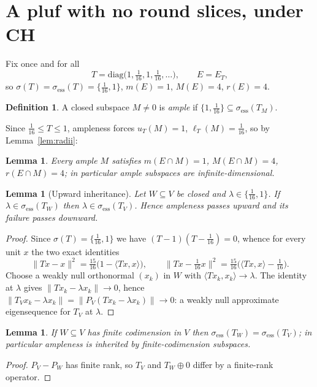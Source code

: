 \documentclass[11pt,reqno]{amsart}
\newtheorem{lemma}[theorem]{Lemma}
\theoremstyle{definition}
\newtheorem{definition}[theorem]{Definition}
\newcommand{\spec}{\sigma}
\newcommand{\sess}{\sigma_{\mathrm{ess}}}
\newcommand{\Mm}{M}   %
\begin{document}
\section{A pluf with no round slices, under CH}\label{sec:neg}

Fix once and for all
\[
T=\mathrm{diag}\bigl(1,\tfrac1{16},1,\tfrac1{16},\dots\bigr),\qquad E=E_T,
\]
so $\spec(T)=\sess(T)=\{\tfrac1{16},1\}$, $m(E)=1$, $\Mm(E)=4$, $r(E)=4$.

\begin{definition}
A closed subspace $M\neq0$ is \emph{ample} if
$\{1,\tfrac1{16}\}\subseteq\sess(T_M)$.
\end{definition}

Since $\tfrac1{16}\le T\le1$, ampleness forces $u_T(M)=1$, $\ell_T(M)=\tfrac1{16}$, so by
Lemma~\ref{lem:radii}:

\begin{lemma}\label{lem:ample-radii}
Every ample $M$ satisfies $m(E\cap M)=1$, $\Mm(E\cap M)=4$, $r(E\cap M)=4$; in particular
ample subspaces are infinite-dimensional.
\end{lemma}

\begin{lemma}[Upward inheritance]\label{lem:upward}
Let $W\subseteq V$ be closed and $\lambda\in\{\tfrac1{16},1\}$. If
$\lambda\in\sess(T_W)$ then $\lambda\in\sess(T_V)$. Hence ampleness passes upward and its
failure passes downward.
\end{lemma}

\begin{proof}
Since $\spec(T)=\{\tfrac1{16},1\}$ we have $(T-1)(T-\tfrac1{16})=0$, whence for every
unit $x$ the two exact identities
\[
\|Tx-x\|^2=\tfrac{15}{16}\bigl(1-\langle Tx,x\rangle\bigr),\qquad
\|Tx-\tfrac1{16}x\|^2=\tfrac{15}{16}\bigl(\langle Tx,x\rangle-\tfrac1{16}\bigr).
\]
Choose a weakly null orthonormal $(x_k)$ in $W$ with $\langle Tx_k,x_k\rangle\to\lambda$.
The identity at $\lambda$ gives $\|Tx_k-\lambda x_k\|\to0$, hence
$\|T_Vx_k-\lambda x_k\|=\|P_V(Tx_k-\lambda x_k)\|\to0$: a weakly null approximate
eigensequence for $T_V$ at $\lambda$.
\end{proof}

\begin{lemma}\label{lem:finitecodim}
If $W\subseteq V$ has finite codimension in $V$ then $\sess(T_W)=\sess(T_V)$; in
particular ampleness is inherited by finite-codimension subspaces.
\end{lemma}

\begin{proof}
$P_V-P_W$ has finite rank, so $T_V$ and $T_W\oplus0$ differ by a finite-rank operator.
\end{proof}
\end{document}
